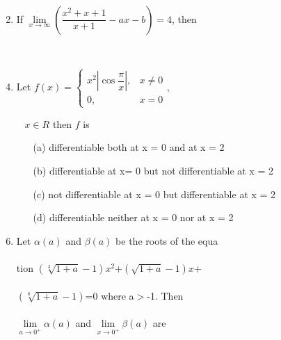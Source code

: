 \documentclass[journal,12pt,twocolumn]{IEEEtran}
\begin{document}
\begin{enumerate}
\item[~] \item If $\lim\limits_{x \to \infty}\left(\dfrac{x^2+x+1}{x+1}-ax-b\right)=4$, then
\begin{itemize}
\end{itemize} 

\item[~] \item Let $f(x)=\begin{cases}
x^2\left|\cos\dfrac{\pi}{x}\right|, & \text{$x\ne 0$}\\
0, & \text{$x=0$}
\end{cases}$, \\ \item[~]$x \in R$ then $f$ is
\begin{itemize}
\item[(a)] differentiable both at x = 0 and at x = 2
\item[(b)] differentiable at x= 0 but not differentiable at x = 2
\item[(c)] not differentiable at x = 0 but differentiable at x = 2
\item[(d)] differentiable neither at x = 0 nor at x = 2
\end{itemize}

\item Let $\alpha(a)$ and $\beta(a)$ be the roots of the equa\\ \\tion
$\left(\sqrt[3]{1+a}-1\right)x^2$+$\left(\sqrt{1+a}-1\right)x$+\\ \\$\left(\sqrt[6]{1+a}-1\right)$=0
 where a$>$-1. Then \\ \\$\lim\limits_{a \to 0^+}\alpha(a)$ and $\lim\limits_{x \to 0^+}\beta(a)$ are
\begin{itemize}
\end{itemize} 


\end{enumerate}
\end{document}
